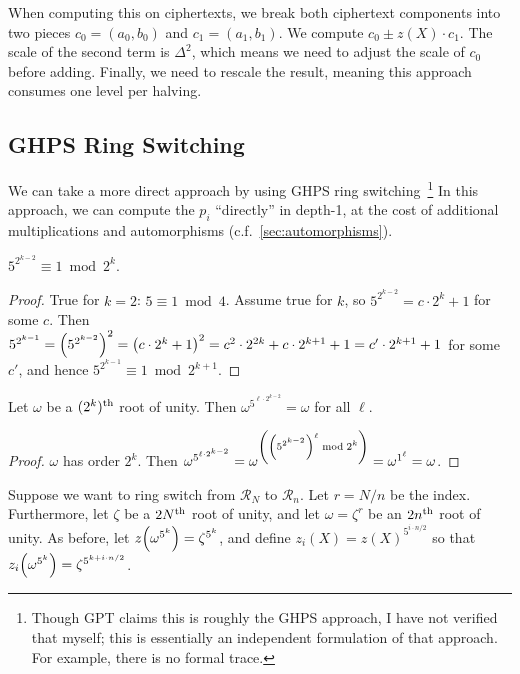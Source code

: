 \documentclass[../fheimpl.tex]{subfiles}
\begin{document}
	When computing this on ciphertexts, we break both ciphertext components into two pieces $c_0=(a_0, b_0)$ and $c_1=(a_1, b_1)$. We compute $c_0\pm z(X)\cdot c_1$. The scale of the second term is $\Delta^2$, which means we need to adjust the scale of $c_0$ before adding. Finally, we need to rescale the result, meaning this approach consumes one level per halving.
	
	\subsection{GHPS Ring Switching}
	We can take a more direct approach by using GHPS ring switching~\cite{cryptoeprint:2012/240}\footnote{Though GPT claims this is roughly the GHPS approach, I have not verified that myself; this is essentially an independent formulation of that approach. For example, there is no formal trace.}
	In this approach, we can compute the $p_i$ ``directly'' in depth-1, at the cost of additional multiplications and automorphisms (c.f.~\cref{sec:automorphisms}).

	\begin{lemma}
		$5^{2^{k-2}}\equiv 1\bmod 2^{k}$.
	\end{lemma}
	\begin{proof}
		True for $k=2$: $5\equiv 1\bmod 4$. Assume true for $k$, so $5^{2^{k-2}} = c\cdot 2^k+1$ for some $c$. Then $5^{2^{k-1}} = \parens*{5^{2^{k-2}}}^2 = \parens*{c\cdot 2^k+1}^2 = c^2\cdot 2^{2k} + c\cdot 2^{k+1} + 1 = c'\cdot 2^{k+1} + 1$ for some $c'$, and hence $5^{2^{k-1}}\equiv 1\bmod 2^{k+1}$.
	\end{proof}
	
	\begin{corollary}
		\label{cor:omegaident}
		Let $\omega$ be a $(2^k)\th$ root of unity. Then $\omega^{5^{\ell\cdot 2^{k-2}}} = \omega$ for all $\ell$.
	\end{corollary}
	\begin{proof}
		$\omega$ has order $2^k$. Then $\omega^{5^{\ell\cdot 2^{k-2}}} = \omega^{\parens*{\parens*{5^{2^{k-2}}}^\ell \bmod 2^k}} = \omega^{1^\ell} = \omega$.
	\end{proof}
	
	Suppose we want to ring switch from $\mathcal{R}_N$ to $\mathcal{R}_n$. Let $r=N/n$ be the index. Furthermore, let $\zeta$ be a $2N\th$ root of unity, and let $\omega=\zeta^r$ be an $2n\th$ root of unity.
	As before, let $z\parens*{\omega^{5^k}} = \zeta^{5^k}$, and define $z_i(X) = z(X)^{5^{i\cdot n/2}}$ so that $z_i\parens*{\omega^{5^k}} = \zeta^{5^{k+i\cdot n/2}}$.
	
\end{document}

